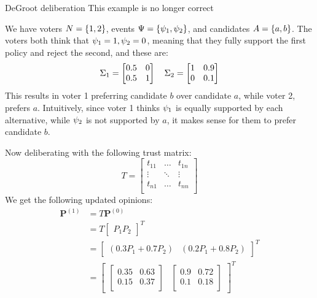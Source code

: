 \begin{example}{DeGroot deliberation}
	{}
	\textcolor{RedViolet}{This example is no longer correct}

	We have voters \(N = \{1,2\}\), events \(\Psi = \{\psi_{1}, \psi_{2}\}\), and candidates \(A = \{a,b\}\). The voters both think that \(\psi_{1} = 1, \psi_{2} = 0\), meaning that they fully support the first policy and reject the second, and these are:
	\[
		\Sigma_1 =\begin{bmatrix}
			0.5 & 0 \\
			0.5 & 1 \\
		\end{bmatrix}\quad
		\Sigma_2 =\begin{bmatrix}
			1 & 0.9 \\
			0 & 0.1 \\
		\end{bmatrix}
	\]
	This results in voter 1 preferring candidate $b$ over candidate $a$, while voter 2, prefers $a$. Intuitively, since voter 1 thinks $\psi_{1}$ is equally supported by each alternative, while $\psi_{2}$ is not supported by $a$, it makes sense for them to prefer candidate $b$.

	Now deliberating with the following trust matrix:
	\[
		T=\begin{bmatrix}
			t_{11} & \dots  & t_{1n} \\
			\vdots & \ddots & \vdots \\
			t_{n1} & \dots  & t_{nn} \\
		\end{bmatrix}
	\]
	We get the following updated opinions:
	\begin{align*}
		\boldsymbol{P}^{(1)} & = T\boldsymbol{P}^{(0)}                                                    \\
		                     & =T\begin{bmatrix}P_1 P_2\end{bmatrix}^{T}                                  \\
		                     & =\begin{bmatrix}(0.3P_1 + 0.7P_{2}) & (0.2P_1 + 0.8P_{2})\end{bmatrix}^{T} \\
		                     & = \begin{bmatrix}
			                         \begin{bmatrix}
				0.35 & 0.63 \\
				0.15 & 0.37 \\
			\end{bmatrix} &
			                         \begin{bmatrix}
				0.9 & 0.72 \\
				0.1 & 0.18 \\
			\end{bmatrix}
		                         \end{bmatrix}^{T}
	\end{align*}


\end{example}
